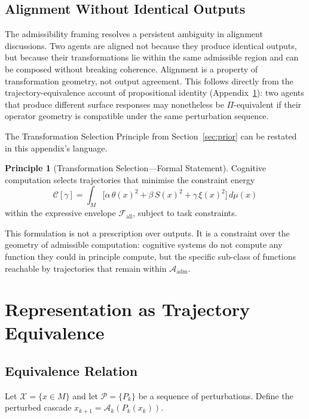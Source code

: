 \documentclass[12pt, a4paper]{article}
\theoremstyle{remark}
\theoremstyle{definition}
\newtheorem{principle}[theorem]{Principle}
\begin{document}
\subsection{Alignment Without Identical Outputs}

The admissibility framing resolves a persistent ambiguity in alignment discussions.  Two
agents are aligned not because they produce identical outputs, but because their
transformations lie within the same admissible region and can be composed without breaking
coherence.  Alignment is a property of transformation geometry, not output agreement.  This
follows directly from the trajectory-equivalence account of propositional identity
(Appendix~\ref{app:equiv}): two agents that produce different surface responses may
nonetheless be $\Pi$-equivalent if their operator geometry is compatible under the same
perturbation sequence.

The Transformation Selection Principle from Section~\ref{sec:prior} can be restated in
this appendix's language.

\begin{principle}[Transformation Selection---Formal Statement]
\label{prin:selection_app}
Cognitive computation selects trajectories that minimise the constraint energy
\[
\mathcal{C}[\gamma]
= \int_M \bigl[\alpha\,\theta(x)^2 + \beta\,S(x)^2 + \gamma\,\xi(x)^2\bigr]\,d\mu(x)
\]
within the expressive envelope $\mathcal{F}_{\mathrm{all}}$, subject to task constraints.
\end{principle}

This formulation is not a prescription over outputs.  It is a constraint over the geometry
of admissible computation: cognitive systems do not compute any function they could in
principle compute, but the specific sub-class of functions reachable by trajectories that
remain within $\mathcal{A}_{\mathrm{adm}}$.

\section{Representation as Trajectory Equivalence}
\label{app:equiv}

\subsection{Equivalence Relation}

Let $\mathcal{X} = \{x \in M\}$ and let $\mathcal{P} = \{P_k\}$ be a sequence of
perturbations.  Define the perturbed cascade $x_{k+1} = \mathcal{A}_k(P_k(x_k))$.
\end{document}
